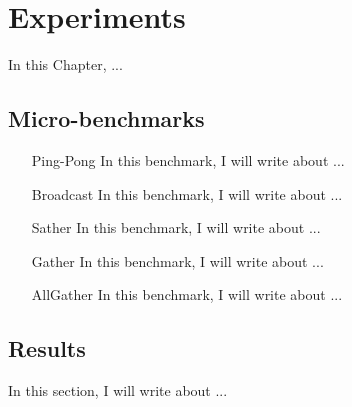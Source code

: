 \chapter{Experiments}
\label{ch.experiments}

In this Chapter, ...

    \section{Micro-benchmarks}

        \begin{itemize}
            \item[Ping-Pong] In this benchmark, I will write about ...
            \item[Broadcast] In this benchmark, I will write about ...
            \item[Sather] In this benchmark, I will write about ...
            \item[Gather] In this benchmark, I will write about ...
            \item[AllGather] In this benchmark, I will write about ...
        \end{itemize}

    \section{Results}

        In this section, I will write about ...